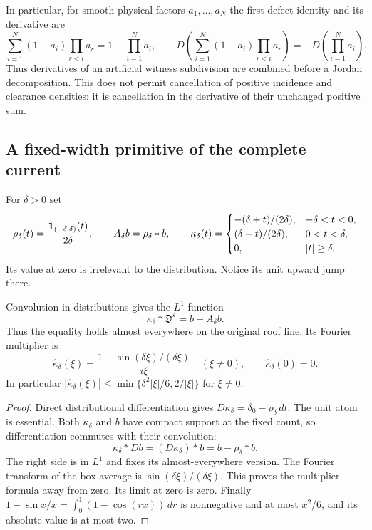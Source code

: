 In particular, for smooth physical factors $a_1,\ldots,a_N$ the
first-defect identity and its derivative are
\[
 \sum_{i=1}^N(1-a_i)\prod_{r<i}a_r=1-\prod_{i=1}^Na_i,
 \qquad
 D\!\left(\sum_{i=1}^N(1-a_i)\prod_{r<i}a_r\right)
                           =-D\!\left(\prod_{i=1}^Na_i\right).
\]
Thus derivatives of an artificial witness subdivision are combined
before a Jordan decomposition. This does not permit cancellation of
positive incidence and clearance densities: it is cancellation in
the derivative of their unchanged positive sum.

\subsection{A fixed-width primitive of the complete current}
For $\delta>0$ set
\begin{equation}\label{eq:v72-average-kernel}
 \rho_\delta(t)=\frac{\one_{(-\delta,\delta)}(t)}{2\delta},
 \qquad A_\delta b=\rho_\delta*b,
 \qquad
 \kappa_\delta(t)=
 \begin{cases}
 -(\delta+t)/(2\delta),&-\delta<t<0,\\
 (\delta-t)/(2\delta),&0<t<\delta,\\
 0,&|t|\ge\delta.
 \end{cases}
\end{equation}
Its value at zero is irrelevant to the distribution. Notice its
unit upward jump there.

\begin{theorem}
\label{thm:v72-current-primitive}
Convolution in distributions gives the $L^1$ function
\begin{equation}\label{eq:v72-current-primitive}
 \kappa_\delta*\mathfrak D^\varepsilon=b-A_\delta b.
\end{equation}
Thus the equality holds almost everywhere on the original roof line.
Its Fourier multiplier is
\begin{equation}\label{eq:v72-current-multiplier}
 \widehat\kappa_\delta(\xi)
  =\frac{1-\sin(\delta\xi)/(\delta\xi)}{i\xi}\quad(\xi\ne0),
 \qquad \widehat\kappa_\delta(0)=0.
\end{equation}
In particular
$|\widehat\kappa_\delta(\xi)|
 \le\min\{\delta^2|\xi|/6,2/|\xi|\}$ for $\xi\ne0$.
\end{theorem}
\begin{proof}
Direct distributional differentiation gives
$D\kappa_\delta=\delta_0-\rho_\delta\,dt$. The unit atom is
essential. Both $\kappa_\delta$ and $b$ have compact support at
the fixed count, so differentiation commutes with their convolution:
\[
 \kappa_\delta*Db=(D\kappa_\delta)*b=b-\rho_\delta*b.
\]
The right side is in $L^1$ and fixes its almost-everywhere version.
The Fourier transform of the box average is
$\sin(\delta\xi)/(\delta\xi)$. This proves the multiplier formula
away from zero. Its limit at zero is zero. Finally
$1-\sin x/x=\int_0^1(1-\cos(rx))\,dr$ is nonnegative and at
most $x^2/6$, and its absolute value is at most two.
\end{proof}

